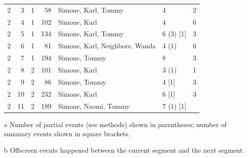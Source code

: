\documentclass[10pt]{article}
\begin{document}
\begin{table}[]
\begin{center}
{\begin{threeparttable}
\begin{tabular}{rrrrlll}
2 & 3  & 1 & 58  & Simone, Karl, Tommy            & 4             & 2         \\
2 & 4  & 1 & 102 & Simone, Karl                   & 4             & 6         \\
2 & 5  & 1 & 134 & Simone, Karl, Tommy            & 6 (3) {[}1{]} & 3         \\
2 & 6  & 1 & 81  & Simone, Karl, Neighbors, Wanda & 4 (1)         & 6         \\
2 & 7  & 1 & 194 & Simone, Tommy                  & 8             & 3         \\
2 & 8  & 2 & 101 & Simone, Karl                   & 3 (1)         & 1         \\
2 & 9  & 2 & 86  & Simone, Tommy                  & 4 {[}1{]}     & 3         \\
2 & 10 & 2 & 232 & Simone, Karl                   & 6 {[}1{]}     & 3         \\
2 & 11 & 2 & 189 & Simone, Naomi, Tommy           & 7 (1) {[}1{]} &           \\ \bottomrule
\end{tabular}
\begin{tablenotes}
\item[a] Number of partial events (see methods) shown in parentheses; number of summary events shown in square brackets.
\item[b] Offscreen events happened between the current segment and the next segment.
\end{tablenotes}
\end{threeparttable}
}
\end{center}
\end{table}
\end{document}
